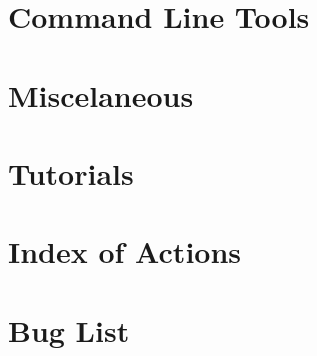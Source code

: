 \documentclass[twoside]{book}
\newcommand{\+}{\discretionary{\mbox{\scriptsize$\hookleftarrow$}}{}{}}
\begin{document}
\chapter{Command Line Tools}
\label{tools}
\hypertarget{tools}{}

\chapter{Miscelaneous}
\label{_miscelaneous}
\hypertarget{_miscelaneous}{}

\chapter{Tutorials}
\label{tutorials}
\hypertarget{tutorials}{}

\chapter{Index of Actions}
\label{glossary}
\hypertarget{glossary}{}

\chapter{Bug List}
\label{bug}
\hypertarget{bug}{}


\newpage
{}
{}



\newpage
{}
{}
\printindex
\end{document}
